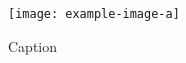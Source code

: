 \begin{figure}
    \centering
    \texttt{[image: example-image-a]}
    \caption{Caption}
    \label{fig:Standard}
\end{figure}